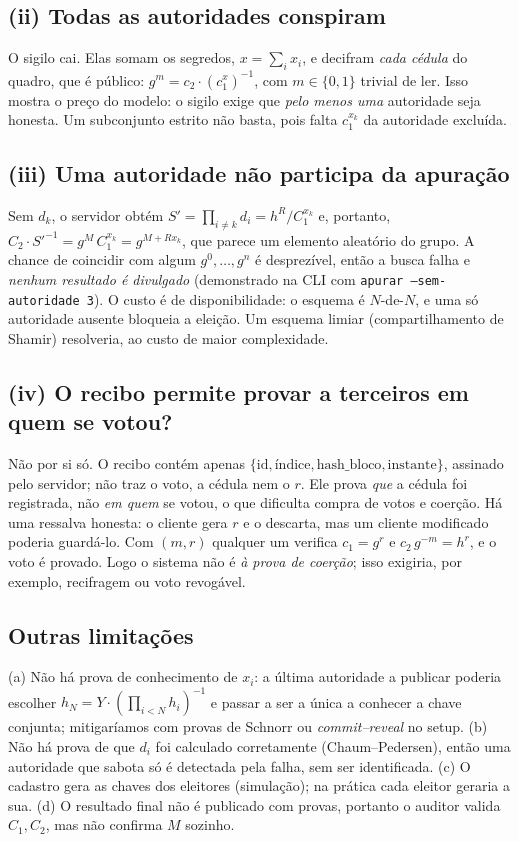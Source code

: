 \documentclass[11pt,a4paper]{article}
\begin{document}
\subsection{(ii) Todas as autoridades conspiram}\label{sec:ii}
O sigilo cai. Elas somam os segredos, $x=\sum_i x_i$, e decifram \emph{cada cédula} do quadro, que é público: $g^{m}=c_2\cdot(c_1^{x})^{-1}$, com $m\in\{0,1\}$ trivial de ler. Isso mostra o preço do modelo: o sigilo exige que \emph{pelo menos uma} autoridade seja honesta. Um subconjunto estrito não basta, pois falta $c_1^{x_k}$ da autoridade excluída.

\subsection{(iii) Uma autoridade não participa da apuração}\label{sec:iii}
Sem $d_k$, o servidor obtém $S'=\prod_{i\ne k}d_i=h^R/C_1^{x_k}$ e, portanto,
$C_2\cdot S'^{-1}=g^{M}\,C_1^{x_k}=g^{M+Rx_k}$, que parece um elemento aleatório do grupo. A chance de coincidir com algum $g^0,\dots,g^n$ é desprezível, então a busca falha e \emph{nenhum resultado é divulgado} (demonstrado na CLI com \texttt{apurar --sem-autoridade 3}). O custo é de disponibilidade: o esquema é $N$-de-$N$, e uma só autoridade ausente bloqueia a eleição. Um esquema limiar (compartilhamento de Shamir) resolveria, ao custo de maior complexidade.

\subsection{(iv) O recibo permite provar a terceiros em quem se votou?}\label{sec:iv}
Não por si só. O recibo contém apenas $\{\text{id},\text{índice},\text{hash\_bloco},\text{instante}\}$, assinado pelo servidor; não traz o voto, a cédula nem o $r$. Ele prova \emph{que} a cédula foi registrada, não \emph{em quem} se votou, o que dificulta compra de votos e coerção. Há uma ressalva honesta: o cliente gera $r$ e o descarta, mas um cliente modificado poderia guardá-lo. Com $(m,r)$ qualquer um verifica $c_1=g^r$ e $c_2\,g^{-m}=h^r$, e o voto é provado. Logo o sistema não é \emph{à prova de coerção}; isso exigiria, por exemplo, recifragem ou voto revogável.

\subsection{Outras limitações}
(a) Não há prova de conhecimento de $x_i$: a última autoridade a publicar poderia escolher $h_N=Y\cdot(\prod_{i<N}h_i)^{-1}$ e passar a ser a única a conhecer a chave conjunta; mitigaríamos com provas de Schnorr ou \emph{commit--reveal} no setup. (b) Não há prova de que $d_i$ foi calculado corretamente (Chaum--Pedersen), então uma autoridade que sabota só é detectada pela falha, sem ser identificada. (c) O cadastro gera as chaves dos eleitores (simulação); na prática cada eleitor geraria a sua. (d) O resultado final não é publicado com provas, portanto o auditor valida $C_1,C_2$, mas não confirma $M$ sozinho.
\end{document}
